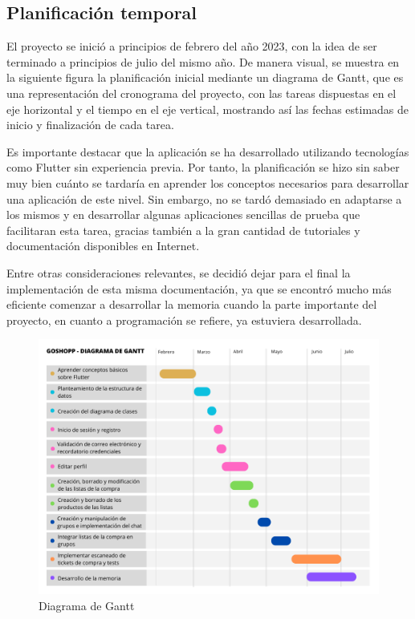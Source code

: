 \documentclass{article}
\begin{document}
\subsection{Planificación temporal}

El proyecto se inició a principios de febrero del año 2023, con la idea de ser terminado a principios de julio del mismo año. De manera visual, se muestra en la siguiente figura la planificación inicial mediante un diagrama de Gantt, que es una representación del cronograma del proyecto, con las tareas dispuestas en el eje horizontal y el tiempo en el eje vertical, mostrando así las fechas estimadas de inicio y finalización de cada tarea.

Es importante destacar que la aplicación se ha desarrollado utilizando tecnologías como Flutter sin experiencia previa. Por tanto, la planificación se hizo sin saber muy bien cuánto se tardaría en aprender los conceptos necesarios para desarrollar una aplicación de este nivel. Sin embargo, no se tardó demasiado en adaptarse a los mismos y en desarrollar algunas aplicaciones sencillas de prueba que facilitaran esta tarea, gracias también a la gran cantidad de tutoriales y documentación disponibles en Internet.

Entre otras consideraciones relevantes, se decidió dejar para el final la implementación de esta misma documentación, ya que se encontró mucho más eficiente comenzar a desarrollar la memoria cuando la parte importante del proyecto, en cuanto a programación se refiere, ya estuviera desarrollada.

\begin{figure}[h]
    \centering
    \includegraphics[width=1\textwidth]{imagenes/diagrama_gantt.png}
    \caption{Diagrama de Gantt}
\end{figure}
\end{document}
